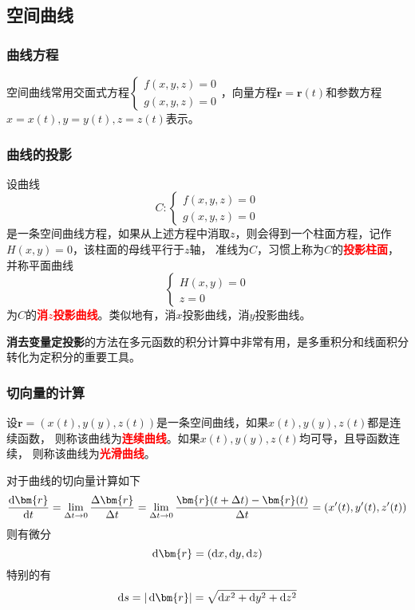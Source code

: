 \subsection{空间曲线}
\subsubsection{曲线方程}
空间曲线常用交面式方程$\displaystyle\begin{cases}
        f(x,y,z)=0 \\
        g(x,y,z)=0
    \end{cases}$，向量方程$\bm{r} = \bm{r}(t)$和参数方程$x=x(t),y=y(t),z=z(t)$表示。

\subsubsection{曲线的投影}
设曲线
\[
    C:
    \begin{cases}
        f(x,y,z)=0 \\
        g(x,y,z)=0
    \end{cases}
\]
是一条空间曲线方程，如果从上述方程中消取$z$，则会得到一个柱面方程，记作$H(x,y)=0$，该柱面的母线平行于$z$轴，
准线为$C$，习惯上称为$C$的\textcolor{red}{\textbf{\textsf{投影柱面}}}，并称平面曲线
\[
    \begin{cases}
        H(x,y)=0 \\
        z=0
    \end{cases}
\]
为$C$的\textcolor{red}{\textbf{\textsf{消$z$投影曲线}}}。类似地有，消$x$投影曲线，消$y$投影曲线。

\textbf{消去变量定投影}的方法在多元函数的积分计算中非常有用，是多重积分和线面积分转化为定积分的重要工具。

\subsubsection{切向量的计算}
设$\bm{r}=(x(t),y(y),z(t))$是一条空间曲线，如果$x(t),y(y),z(t)$都是连续函数，
则称该曲线为\textcolor{red}{\textbf{\textsf{连续曲线}}}。如果$x(t),y(y),z(t)$均可导，且导函数连续，
则称该曲线为\textcolor{red}{\textbf{\textsf{光滑曲线}}}。

对于曲线的切向量计算如下
\begin{equation}
    \frac{\diff \bm{r}}{\diff{t}}
    = \lim_{\Delta t \to 0}\frac{\Delta \bm{r}}{\Delta t}
    = \lim_{\Delta t \to 0}\frac{\bm{r}(t+\Delta t) - \bm{r}(t)}{\Delta t}
    = (x'(t),y'(t),z'(t))
\end{equation}
则有微分
\begin{equation}
    \diff \bm{r} = (\diff x, \diff y, \diff z)
\end{equation}
特别的有
\begin{equation}
    \diff s = |\diff \bm{r}| = \sqrt{\diff x^2+ \diff y^2 + \diff z^2}
\end{equation}

